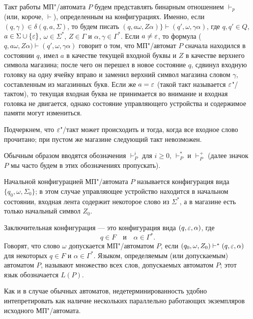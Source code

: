 Такт работы МП"/автомата $P$ будем представлять бинарным отношением $\vdash_p$ (или, короче, $\vdash$), определенным на конфигурациях. Именно, если $(q,\gamma)\in\delta(q,a,\Sigma)$, то будем писать $(q,a\omega,Z\alpha)\}\vdash(q',\omega,\gamma\alpha)$, где $q,q'\in Q$, $a\in\Sigma\cup\{\varepsilon\}$, $\omega\in\Sigma^*$, $Z\in\Gamma$ и $\alpha,\gamma\in\Gamma^*$. Если $a\neq\varepsilon$, то формула ($q,a\omega,Z\alpha)\vdash(q',\omega,\gamma\alpha)$ говорит о том, что МП"/автомат $P$ сначала находился в состоянии $q$, имел $a$ в качестве текущей входной буквы и $Z$ в качестве верхнего символа магазина; после чего он перешел в новое состояние $q$, сдвинул входную головку на одну ячейку вправо и заменил верхний символ магазина словом $\gamma$, составленным из магазинных букв. Если же $a=\varepsilon$ (такой такт называется $\varepsilon$"/тактом), то текущая входная буква не принимается во внимание и входная головка не двигается, однако состояние управляющего устройства и содержимое памяти могут измениться.

Подчеркнем, что $\varepsilon$"/такт может происходить и тогда, когда все входное слово прочитано; при пустом же магазине следующий такт невозможен.

Обычным образом вводятся обозначения $\vdash_P^i$ для $i\ge 0$, $\vdash_P^*$ и $\vdash_P^+$ (далее значок $P$ мы часто будем в этих обозначениях пропускать).

Начальной конфигурацией МП"/автомата $P$ называется конфигурация вида $\{q_0,\omega,\Sigma_0\}$; в этом случае управляющее устройство находится в начальном состоянии, входная лента содержит некоторое слово из $\Sigma^*$, а в магазине есть только начальный символ $Z_0$.

Заключительная конфигурация --- это конфигурация вида $(q,\varepsilon,\alpha)$, где
\[
    q\in F \quad \text{и} \quad \alpha\in\Gamma^*.
\]
Говорят, что слово $\omega$ допускается
МП"/автоматом $P$, если $(q_0,\omega,Z_0)\vdash^*
(q,\varepsilon,\alpha)$ для некоторых $q\in F$ и
$\alpha\in\Gamma^*$. Языком, определяемым (или
допускаемым) автоматом $P$, называют множество всех
слов, допускаемых автоматом $P$; этот язык
обозначается $L(P)$.

Как и в случае обычных автоматов, недетерминированность удобно интепретировать как наличие нескольких параллельно работающих экземпляров исходного МП"/автомата.

